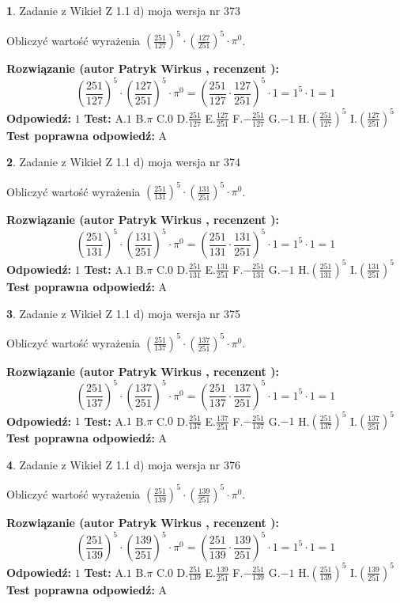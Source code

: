 \documentclass[12pt, a4paper]{article}
\theoremstyle{definition} %
\newtheorem{zad}{}
\newcommand{\zadStart}[1]{\begin{zad}#1\newline}
\newcommand{\zadStop}{\end{zad}}
\newcommand{\rozwStart}[2]{\noindent \textbf{Rozwiązanie (autor #1 , recenzent #2): }\newline}
\newcommand{\rozwStop}{\newline}
\newcommand{\odpStart}{\noindent \textbf{Odpowiedź:}\newline}
\newcommand{\odpStop}{\newline}
\newcommand{\testStart}{\noindent \textbf{Test:}\newline}
\newcommand{\testStop}{\newline}
\newcommand{\kluczStart}{\noindent \textbf{Test poprawna odpowiedź:}\newline}
\newcommand{\kluczStop}{\newline}
\begin{document}
\zadStart{Zadanie z Wikieł Z 1.1 d) moja wersja nr 373}

Obliczyć wartość wyrażenia $(\frac{251}{127})^{5} \cdot (\frac{127}{251})^{5} \cdot \pi^{0}$.
\zadStop
\rozwStart{Patryk Wirkus}{}
$$(\frac{251}{127})^{5} \cdot (\frac{127}{251})^{5} \cdot \pi^{0} = (\frac{251}{127} \cdot \frac{127}{251})^{5} \cdot 1 = 1^{5} \cdot 1 = 1$$
\rozwStop
\odpStart
$1$
\odpStop
\testStart
A.$1$ B.$\pi$ C.$0$ D.$\frac{251}{127}$ E.$\frac{127}{251}$
F.$-\frac{251}{127}$ G.$-1$
H.$(\frac{251}{127})^{5}$
I.$(\frac{127}{251})^{5}$
\testStop
\kluczStart
A
\kluczStop



\zadStart{Zadanie z Wikieł Z 1.1 d) moja wersja nr 374}

Obliczyć wartość wyrażenia $(\frac{251}{131})^{5} \cdot (\frac{131}{251})^{5} \cdot \pi^{0}$.
\zadStop
\rozwStart{Patryk Wirkus}{}
$$(\frac{251}{131})^{5} \cdot (\frac{131}{251})^{5} \cdot \pi^{0} = (\frac{251}{131} \cdot \frac{131}{251})^{5} \cdot 1 = 1^{5} \cdot 1 = 1$$
\rozwStop
\odpStart
$1$
\odpStop
\testStart
A.$1$ B.$\pi$ C.$0$ D.$\frac{251}{131}$ E.$\frac{131}{251}$
F.$-\frac{251}{131}$ G.$-1$
H.$(\frac{251}{131})^{5}$
I.$(\frac{131}{251})^{5}$
\testStop
\kluczStart
A
\kluczStop



\zadStart{Zadanie z Wikieł Z 1.1 d) moja wersja nr 375}

Obliczyć wartość wyrażenia $(\frac{251}{137})^{5} \cdot (\frac{137}{251})^{5} \cdot \pi^{0}$.
\zadStop
\rozwStart{Patryk Wirkus}{}
$$(\frac{251}{137})^{5} \cdot (\frac{137}{251})^{5} \cdot \pi^{0} = (\frac{251}{137} \cdot \frac{137}{251})^{5} \cdot 1 = 1^{5} \cdot 1 = 1$$
\rozwStop
\odpStart
$1$
\odpStop
\testStart
A.$1$ B.$\pi$ C.$0$ D.$\frac{251}{137}$ E.$\frac{137}{251}$
F.$-\frac{251}{137}$ G.$-1$
H.$(\frac{251}{137})^{5}$
I.$(\frac{137}{251})^{5}$
\testStop
\kluczStart
A
\kluczStop



\zadStart{Zadanie z Wikieł Z 1.1 d) moja wersja nr 376}

Obliczyć wartość wyrażenia $(\frac{251}{139})^{5} \cdot (\frac{139}{251})^{5} \cdot \pi^{0}$.
\zadStop
\rozwStart{Patryk Wirkus}{}
$$(\frac{251}{139})^{5} \cdot (\frac{139}{251})^{5} \cdot \pi^{0} = (\frac{251}{139} \cdot \frac{139}{251})^{5} \cdot 1 = 1^{5} \cdot 1 = 1$$
\rozwStop
\odpStart
$1$
\odpStop
\testStart
A.$1$ B.$\pi$ C.$0$ D.$\frac{251}{139}$ E.$\frac{139}{251}$
F.$-\frac{251}{139}$ G.$-1$
H.$(\frac{251}{139})^{5}$
I.$(\frac{139}{251})^{5}$
\testStop
\kluczStart
A
\kluczStop
\end{document}
